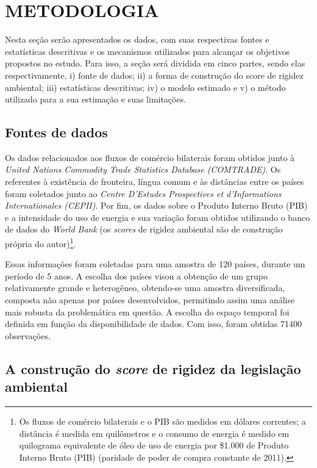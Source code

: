\section{METODOLOGIA}

Nesta seção serão apresentados os dados, com suas respectivas fontes e estatísticas descritivas e os mecanismos utilizados para alcançar os objetivos propostos no estudo. Para isso, a seção será dividida em cinco partes, sendo elas respectivamente, i) fonte de dados; ii) a forma de construção do score de rigidez ambiental; iii) estatísticas descritivas; iv) o modelo estimado e v) o método utilizado para a sua estimação e suas limitações.

\subsection{Fontes de dados}

Os dados relacionados aos fluxos de comércio bilaterais  foram obtidos junto à \textit{United Nations Commodity Trade Statistics Database (COMTRADE)}. Os referentes à existência de fronteira, língua comum e às distâncias entre os países foram coletados junto ao \textit{Centre D’Estudes Prospectives et d’Informations Internationales (CEPII)}. Por fim, os dados sobre o Produto Interno Bruto (PIB) e a intensidade do uso de energia e sua variação foram obtidos utilizando o banco de dados do \textit{World Bank} (os \textit{scores} de rigidez ambiental são de construção própria do autor)\footnote{Os fluxos de comércio bilaterais e o PIB são medidos em dólares correntes; a distância é medida em quilômetros e o consumo de energia é medido em quilograma equivalente de óleo de uso de energia por \$1.000 de Produto Interno Bruto (PIB) (paridade de poder de compra constante de 2011).}.

Essas informações foram coletadas para uma amostra de 120 países, durante um período de 5 anos. A escolha dos países visou a obtenção de um grupo relativamente grande e heterogêneo, obtendo-se uma amostra diversificada, composta não apenas por países desenvolvidos, permitindo assim uma análise mais robusta da problemática em questão. A escolha do espaço temporal foi definida em função da disponibilidade de dados. Com isso, foram obtidas 71400 observações. 

\subsection{A construção do \textit{score} de rigidez da legislação ambiental}

